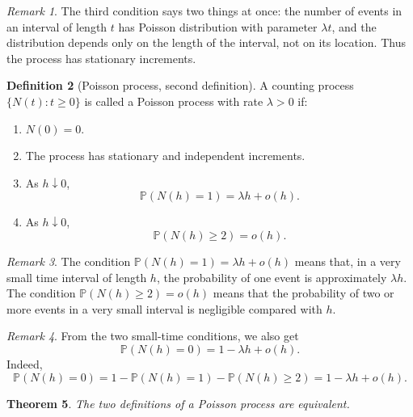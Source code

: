 \documentclass[11pt]{article}
\theoremstyle{plain}
\newtheorem{theorem}{Theorem}[section]
\theoremstyle{definition}
\newtheorem{definition}[theorem]{Definition}
\theoremstyle{remark}
\newtheorem{remark}[theorem]{Remark}
\begin{document}
\begin{remark}
	The third condition says two things at once: the number of events in an interval of length \(t\) has Poisson distribution with parameter \(\lambda t\), and the distribution depends only on the length of the interval, not on its location. Thus the process has stationary increments.
\end{remark}

\begin{definition}[Poisson process, second definition]
	A counting process \(\{N(t):t\ge 0\}\) is called a Poisson process with rate \(\lambda>0\) if:
	\begin{enumerate}[leftmargin=2em]
		\item \(N(0)=0\).
		\item The process has stationary and independent increments.
		\item As \(h\downarrow 0\),
		\[
		\mathbb{P}(N(h)=1)=\lambda h+o(h).
		\]
		\item As \(h\downarrow 0\),
		\[
		\mathbb{P}(N(h)\ge 2)=o(h).
		\]
	\end{enumerate}
\end{definition}

\begin{remark}
	The condition \(\mathbb{P}(N(h)=1)=\lambda h+o(h)\) means that, in a very small time interval of length \(h\), the probability of one event is approximately \(\lambda h\). The condition \(\mathbb{P}(N(h)\ge 2)=o(h)\) means that the probability of two or more events in a very small interval is negligible compared with \(h\).
\end{remark}

\begin{remark}
	From the two small-time conditions, we also get
	\[
	\mathbb{P}(N(h)=0)=1-\lambda h+o(h).
	\]
	Indeed,
	\[
	\mathbb{P}(N(h)=0)
	=
	1-\mathbb{P}(N(h)=1)-\mathbb{P}(N(h)\ge 2)
	=
	1-\lambda h+o(h).
	\]
\end{remark}

\begin{theorem}
	The two definitions of a Poisson process are equivalent.
\end{theorem}
\end{document}
